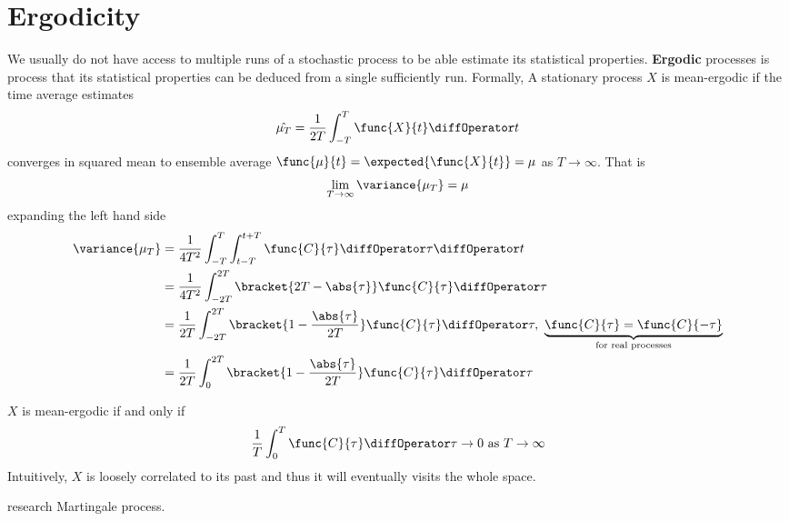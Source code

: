 \section{Ergodicity}
We usually do not have access to multiple runs of a stochastic process to be able estimate its statistical properties. \textbf{Ergodic} processes is process that its statistical properties can be deduced from a single sufficiently run. Formally, A stationary process \(X\) is mean-ergodic if the time average estimates 
\begin{equation*}
    \hat{\mu_T} = \dfrac{1}{2T} \int_{-T}^T \func{X}{t} \diffOperator t 
\end{equation*}
converges in squared mean to ensemble average \(\func{\mu}{t} = \expected{\func{X}{t}} = \mu\) as \(T \to \infty\).  That is
\begin{equation*}
    \lim_{T \to \infty} \variance{\mu_T} = \mu
\end{equation*}
expanding the left hand side 
\begin{align*}
    \variance{\mu_T} &= \dfrac{1}{4T^2} \int_{-T}^{T} \int_{t - T}^{t + T} \func{C}{\tau}  \diffOperator \tau \diffOperator t\\
    &= \dfrac{1}{4T^2} \int_{-2T}^{2T} \bracket{2T - \abs{\tau}} \func{C}{\tau}  \diffOperator \tau \\
    &= \dfrac{1}{2T} \int_{-2T}^{2T} \bracket{1 - \frac{\abs{\tau}}{2T}} \func{C}{\tau}  \diffOperator \tau, \ \underbrace{\func{C}{\tau} = \func{C}{-\tau}}_{\text{for real processes}}\\
    &= \dfrac{1}{2T} \int_{0}^{2T} \bracket{1 - \frac{\abs{\tau}}{2T}} \func{C}{\tau}  \diffOperator \tau
\end{align*}

\begin{theorem}[Slutsky]
    \(X\) is mean-ergodic if and only if 
    \begin{equation*}
        \frac{1}{T} \int_{0}^T \func{C}{\tau} \diffOperator \tau \to 0 \ \text{as} \ T \to \infty
    \end{equation*}
    Intuitively, \(X\) is loosely correlated to its past and thus it will eventually visits the whole space.
\end{theorem}
\begin{remark}
    research Martingale process.
\end{remark}


